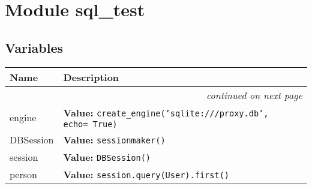%
%
%


    \section{Module sql_test}
    \label{sql_test}


  \subsection{Variables}

    \vspace{-1cm}
\hspace{\varindent}\begin{longtable}{|p{\varnamewidth}|p{\vardescrwidth}|l}
\cline{1-2}
\cline{1-2} \centering \textbf{Name} & \centering \textbf{Description}& \\
\cline{1-2}
\endhead\cline{1-2}\multicolumn{3}{r}{\small\textit{continued on next page}}\\\endfoot\cline{1-2}
\endlastfoot\raggedright e\-n\-g\-i\-n\-e\- & \raggedright \textbf{Value:} 
{\tt create\_engine('sqlite:///proxy.db', echo= True)}&\\
\cline{1-2}
\raggedright D\-B\-S\-e\-s\-s\-i\-o\-n\- & \raggedright \textbf{Value:} 
{\tt sessionmaker()}&\\
\cline{1-2}
\raggedright s\-e\-s\-s\-i\-o\-n\- & \raggedright \textbf{Value:} 
{\tt DBSession()}&\\
\cline{1-2}
\raggedright p\-e\-r\-s\-o\-n\- & \raggedright \textbf{Value:} 
{\tt session.query(User).first()}&\\
\cline{1-2}
\end{longtable}

